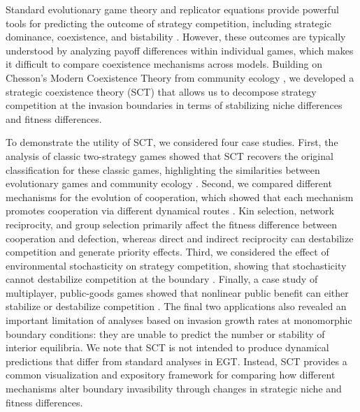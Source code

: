 \documentclass[12pt]{article}
\begin{document}
Standard evolutionary game theory and replicator equations provide powerful tools for predicting the outcome of strategy competition, including strategic dominance, coexistence, and bistability \citep{motro1991co,doebeli2004evolutionary,hauert2004spatial,doebeli2005models,gore2009snowdrift,souza2009evolution,archetti2011coexistence,steidinger2014coexistence,tarnita2025reconciling}.
However, these outcomes are typically understood by analyzing payoff differences within individual games, which makes it difficult to compare coexistence mechanisms across models.
Building on Chesson's Modern Coexistence Theory from community ecology \citep{chesson2000mechanisms}, we developed a strategic coexistence theory (SCT) that allows us to decompose strategy competition at the invasion boundaries in terms of stabilizing niche differences and fitness differences.

To demonstrate the utility of SCT, we considered four case studies.
First, the analysis of classic two-strategy games showed that SCT recovers the original classification for these classic games, highlighting the similarities between evolutionary games and community ecology \citep{hauert2002effects,szabo2007evolutionary,cooney2020analysis,tarnita2025reconciling}.
Second, we compared different mechanisms for the evolution of cooperation, which showed that each mechanism promotes cooperation via different dynamical routes \citep{nowak2006five}.
Kin selection, network reciprocity, and group selection primarily affect the fitness difference between cooperation and defection, whereas direct and indirect reciprocity can destabilize competition and generate priority effects.
Third, we considered the effect of environmental stochasticity on strategy competition, showing that stochasticity cannot destabilize competition at the boundary \citep{wang2025evolution}.
Finally, a case study of multiplayer, public-goods games showed that nonlinear public benefit can either stabilize or destabilize competition \citep{motro1991co,archetti2012game}.
The final two applications also revealed an important limitation of analyses based on invasion growth rates at monomorphic boundary conditions: they are unable to predict the number or stability of interior equilibria.
We note that SCT is not intended to produce dynamical predictions that differ from standard analyses in EGT.
Instead, SCT provides a common visualization and expository framework for comparing how different mechanisms alter boundary invasibility through changes in strategic niche and fitness differences.
\end{document}
